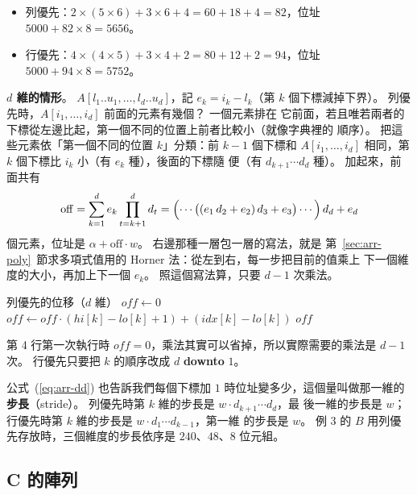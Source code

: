 \begin{itemize}
\item 列優先：$2 \times (5 \times 6) + 3 \times 6 + 4 = 60 + 18 + 4 = 82$，位址
$5000 + 82 \times 8 = 5656$。
\item 行優先：$4 \times (4 \times 5) + 3 \times 4 + 2 = 80 + 12 + 2 = 94$，位址
$5000 + 94 \times 8 = 5752$。
\end{itemize}

\textbf{$d$ 維的情形}。 $A[l_1..u_1, \ldots, l_d..u_d]$，記 $e_k = i_k - l_k$（第 $k$
個下標減掉下界）。 列優先時，$A[i_1, \ldots, i_d]$ 前面的元素有幾個？ 一個元素排在
它前面，若且唯若兩者的下標從左邊比起，第一個不同的位置上前者比較小（就像字典裡的
順序）。 把這些元素依「第一個不同的位置 $k$」分類：前 $k - 1$ 個下標和
$A[i_1, \ldots, i_d]$ 相同，第 $k$ 個下標比 $i_k$ 小（有 $e_k$ 種），後面的下標隨
便（有 $d_{k+1} \cdots d_d$ 種）。 加起來，前面共有
\begin{equation}
\mathrm{off} = \sum_{k=1}^{d} e_k \prod_{t=k+1}^{d} d_t
= \Bigl(\cdots\bigl((e_1\,d_2 + e_2)\,d_3 + e_3\bigr)\cdots\Bigr)\,d_d + e_d
\label{eq:arr-dd}
\end{equation}
個元素，位址是 $\alpha + \mathrm{off} \cdot w$。 右邊那種一層包一層的寫法，就是
第~\ref{sec:arr-poly}~節求多項式值用的 Horner 法：從左到右，每一步把目前的值乘上
下一個維度的大小，再加上下一個 $e_k$。 照這個寫法算，只要 $d - 1$ 次乘法。

\begin{pseudo}[label=alg:arr-offset]{列優先的位移（$d$ 維）}
    \State $\mathit{off} \gets 0$
        \State $\mathit{off} \gets \mathit{off} \cdot (\mathit{hi}[k] - \mathit{lo}[k] + 1)
        + (\mathit{idx}[k] - \mathit{lo}[k])$
    \EndFor
    \State \Return $\mathit{off}$
\EndFunction
\end{pseudo}

第 4 行第一次執行時 $\mathit{off} = 0$，乘法其實可以省掉，所以實際需要的乘法是
$d - 1$ 次。 行優先只要把 $k$ 的順序改成 $d$ \textbf{downto} $1$。

公式~(\ref{eq:arr-dd}) 也告訴我們每個下標加 $1$ 時位址變多少，這個量叫做那一維的
\textbf{步長}（stride）。 列優先時第 $k$ 維的步長是 $w \cdot d_{k+1} \cdots d_d$，最
後一維的步長是 $w$；行優先時第 $k$ 維的步長是 $w \cdot d_1 \cdots d_{k-1}$，第一維
的步長是 $w$。 例 3 的 $B$ 用列優先存放時，三個維度的步長依序是 $240$、$48$、$8$
位元組。

\subsection{C 的陣列}

